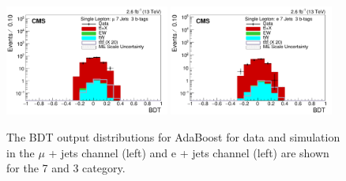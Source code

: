 \begin{figure}[ht!]
    \includegraphics[width=0.48\textwidth]{images/Run2/BDT_Mu29Aug400trees_5MinNodeSize_20nCuts_3MaxDepth_5adaboostbeta_adaBoost_alphaSTune_noMinEvents7nJets3nMtags_StackLogY.pdf}
    \includegraphics[width=0.48\textwidth]{images/Run2/BDT_El29Aug400trees_5MinNodeSize_20nCuts_3MaxDepth_5adaboostbeta_adaBoost_alphaSTune_noMinEvents7nJets3nMtags_StackLogY.pdf}
    \caption{The BDT output distributions for AdaBoost for data and simulation in the $\mu$ + jets channel (left) and e + jets channel (left) are shown for the 7 \njets and 3 \nMtags category.}
    \label{fig:BDT_Mu29Aug400trees_5MinNodeSize_20nCuts_3MaxDepth_5adaboostbeta_adaBoost_alphaSTune_noMinEvents73}
 \end{figure}

